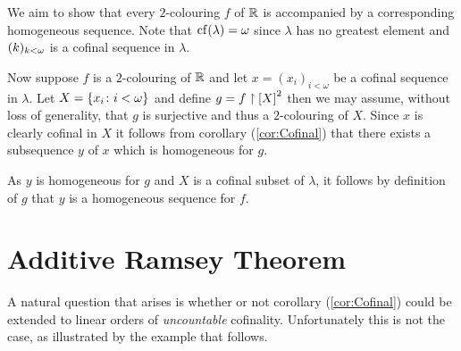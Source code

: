 \begin{exm}

	We aim to show that every $2$-colouring $f$ of $\reals$ is accompanied by a
	corresponding homogeneous sequence.  Note that $\cf(\lambda)=\omega$ since
	$\lambda$ has no greatest element and $\family{k}{k<\omega}$ is a cofinal
	sequence in $\lambda$.

	Now suppose $f$ is a $2$-colouring of $\reals$ and let $x=(x_i)_{i<\omega}$
	be a cofinal sequence in $\lambda$.  Let $X=\setbuild{x_i}{i<\omega}$ and
	define $g=f\restriction \subsets{2}{X}$ then we may assume, without loss of
	generality, that $g$ is surjective and thus a $2$-colouring of $X$.  Since
	$x$ is clearly cofinal in $X$ it follows from corollary (\ref{cor:Cofinal})
	that there exists a subsequence $y$ of $x$ which is homogeneous for $g$.

	As $y$ is homogeneous for $g$ and $X$ is a cofinal subset of $\lambda$, it
	follows by definition of $g$ that $y$ is a homogeneous sequence for $f$.

\end{exm}


\section{Additive Ramsey Theorem}

A natural question that arises is whether or not corollary (\ref{cor:Cofinal})
could be extended to linear orders of \textit{uncountable} cofinality.
Unfortunately this is not the case, as illustrated by the example that follows.

